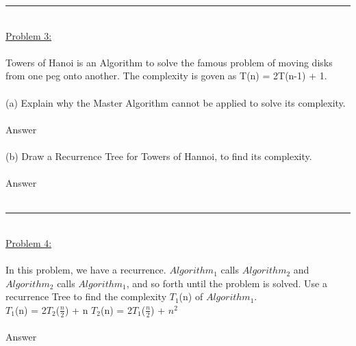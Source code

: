 \documentclass{article}
\begin{document}
    \rule{\textwidth}{0.5pt}\\
    \underline{Problem 3:}\\\\
    Towers of Hanoi is an Algorithm to solve the famous problem of moving disks from one peg onto another. The complexity is goven as T(n) = 2T(n-1) + 1.\\
    \\
    (a) Explain why the Master Algorithm cannot be applied to solve its complexity.\\
    \\
    \indent Answer\\
    \\
    (b) Draw a Recurrence Tree for Towers of Hannoi, to find its complexity.\\
    \\
    \indent Answer\\
    \\
    \rule{\textwidth}{0.5pt}\\
    \underline{Problem 4:}\\\\
    In this problem, we have a recurrence. $Algorithm_1$ calls $Algorithm_2$ and $Algorithm_2$ calls $Algorithm_1$, and so forth until the problem is solved. Use a recurrence Tree to find the complexity $T_1$(n) of $Algorithm_1$.\\
    \indent $T_1$(n) = 2$T_2$($\frac{n}{2}$) + n \hspace{5cm} $T_2$(n) = 2$T_1$($\frac{n}{2}$) + $n^2$\\
    \\
    \indent Answer\\
    \\
\end{document}
